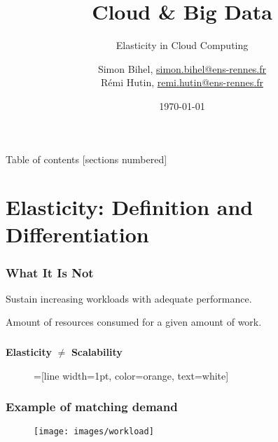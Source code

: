 \documentclass{beamer}
\title{Cloud \& Big Data}
\subtitle{Elasticity in Cloud Computing}
\date{\today}
\author{%
  Simon Bihel, \url{simon.bihel@ens-rennes.fr} \\
  Rémi Hutin, \url{remi.hutin@ens-rennes.fr}
}
\institute{%
  University of Rennes I \\
  École normale supérieure de Rennes
}
\begin{document}
\maketitle

\begin{frame}{Table of contents}
  [sections numbered]
  \tableofcontents[hideallsubsections]
\end{frame}


\section{Elasticity: Definition and Differentiation}
\begin{frame}
  \frametitle{What It Is Not~\cite{herbst2013elasticity}}
  \begin{description}
    \parbox{\linewidth}{%
    \item[Scalability] Sustain increasing workloads with adequate performance.
    \item[Efficiency] Amount of resources consumed for a given amount of work.
    }
  \end{description}
\end{frame}

\begin{frame}
  \frametitle{}
  \centering
  \Large\textbf{Elasticity} $\neq$ \textbf{Scalability}

\end{frame}

\begin{frame}
\begin{figure}
=[line width=1pt, color=orange, text=white]
\def\firstcircle{(-2.85,0) circle (1.5cm)}
\def\secondcircle{(0,2.85) circle (1.5cm)}
\def\thirdcircle{(2.85,0) circle (1.5cm)}
\end{figure}
\end{frame}

\begin{frame}
  \frametitle{Example of matching demand~\cite{herbst2013elasticity}}
  \begin{figure}
    \texttt{[image: images/workload]}
  \end{figure}
\end{frame}
\end{document}
